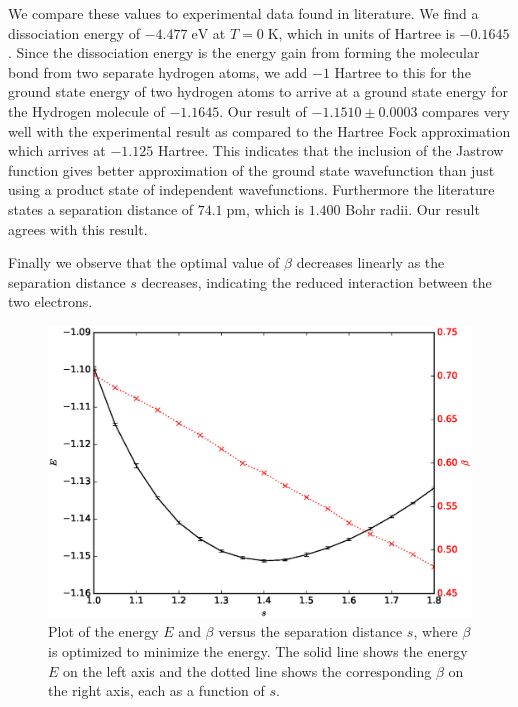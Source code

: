 \documentclass[twoside]{article}
\newcommand{\unit}[1]{\ensuremath{\; \mathrm{#1}}}
\begin{document}
We compare these values to experimental data found in literature\cite{ref_NIST}\cite{ref_Grinter}. We find a dissociation energy of $-4.477 \unit{eV}$ at $T=0 \unit{K}$, which in units of Hartree is $-0.1645$. Since the dissociation energy is the energy gain from forming the molecular bond from two separate hydrogen atoms, we add $-1$ Hartree to this for the ground state energy of two hydrogen atoms to arrive at a ground state energy for the Hydrogen molecule of $-1.1645$. Our result of $-1.1510 \pm 0.0003$ compares very well with the experimental result as compared to the Hartree Fock approximation which arrives at $-1.125$ Hartree. This indicates that the inclusion of the Jastrow function gives better approximation of the ground state wavefunction than just using a product state of independent wavefunctions. Furthermore the literature states a separation distance of $74.1 \unit{pm}$, which is $1.400$ Bohr radii. Our result agrees with this result.

Finally we observe that the optimal value of $\beta$ decreases linearly as the separation distance $s$ decreases, indicating the reduced interaction between the two electrons.

\begin{figure}
	\centering
	\includegraphics[width=0.8\linewidth]{figs/EvsS_optimalBeta.eps}
	\caption{Plot of the energy $E$ and $\beta$ versus the separation distance $s$, where $\beta$ is optimized to minimize the energy. The solid line shows the energy $E$ on the left axis and the dotted line shows the corresponding $\beta$ on the right axis, each as a function of $s$.}
	\label{fig:EvsS_optimalBeta}
\end{figure}
\end{document}
